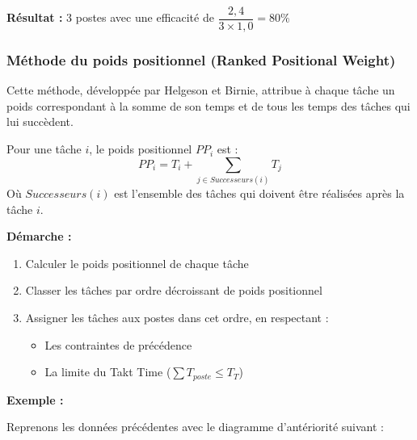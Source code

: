 \documentclass[12pt,a4paper]{article}
\newenvironment{methodbox}[1]
  {\begin{tcolorbox}[colback=blue!5!white, colframe=methodcolor, title=#1]\small}
  {\end{tcolorbox}}
\begin{document}
\textbf{Résultat :} 3 postes avec une efficacité de $\dfrac{2,4}{3 \times 1,0} = 80\%$

\subsubsection{Méthode du poids positionnel (Ranked Positional Weight)}

Cette méthode, développée par Helgeson et Birnie, attribue à chaque tâche un poids correspondant à la somme de son temps et de tous les temps des tâches qui lui succèdent.

\begin{methodbox}{Calcul du poids positionnel}
Pour une tâche $i$, le poids positionnel $PP_i$ est :
\[
PP_i = T_i + \sum_{j \in Successeurs(i)} T_j
\]
Où $Successeurs(i)$ est l'ensemble des tâches qui doivent être réalisées après la tâche $i$.
\end{methodbox}

\textbf{Démarche :}

\begin{enumerate}
    \item Calculer le poids positionnel de chaque tâche
    \item Classer les tâches par ordre décroissant de poids positionnel
    \item Assigner les tâches aux postes dans cet ordre, en respectant :
    \begin{itemize}
        \item Les contraintes de précédence
        \item La limite du Takt Time ($\sum T_{poste} \leq T_T$)
    \end{itemize}
\end{enumerate}

\textbf{Exemple :}

Reprenons les données précédentes avec le diagramme d'antériorité suivant :

\begin{center}
\end{center}
\end{document}
